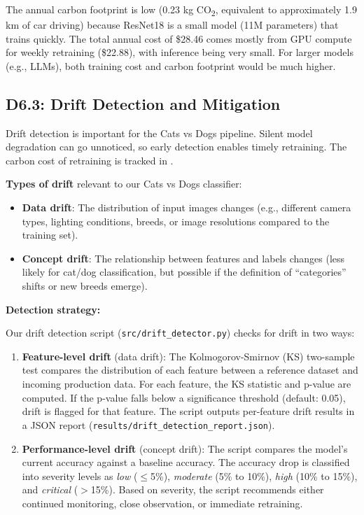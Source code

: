 \documentclass[10pt,twocolumn,letterpaper]{article}
\begin{document}
The annual carbon footprint is low (0.23 kg CO\textsubscript{2}, equivalent to approximately 1.9 km of car driving) because ResNet18 is a small model (11M parameters) that trains quickly. The total annual cost of \$28.46 comes mostly from GPU compute for weekly retraining (\$22.88), with inference being very small. For larger models (e.g., LLMs), both training cost and carbon footprint would be much higher.

\subsection{D6.3: Drift Detection and Mitigation}

Drift detection is important for the Cats vs Dogs pipeline. Silent model degradation can go unnoticed, so early detection enables timely retraining. The carbon cost of retraining is tracked in .

\textbf{Types of drift} relevant to our Cats vs Dogs classifier:

\begin{itemize}
    \item \textbf{Data drift}: The distribution of input images changes (e.g., different camera types, lighting conditions, breeds, or image resolutions compared to the training set).
    \item \textbf{Concept drift}: The relationship between features and labels changes (less likely for cat/dog classification, but possible if the definition of ``categories'' shifts or new breeds emerge).
\end{itemize}

\textbf{Detection strategy:}

Our drift detection script (\texttt{src/drift\_detector.py}) checks for drift in two ways:

\begin{enumerate}
    \item \textbf{Feature-level drift} (data drift): The Kolmogorov-Smirnov (KS) two-sample test compares the distribution of each feature between a reference dataset and incoming production data. For each feature, the KS statistic and p-value are computed. If the p-value falls below a significance threshold (default: 0.05), drift is flagged for that feature. The script outputs per-feature drift results in a JSON report (\texttt{results/drift\_detection\_report.json}).

    \item \textbf{Performance-level drift} (concept drift): The script compares the model's current accuracy against a baseline accuracy. The accuracy drop is classified into severity levels as \textit{low} ($\leq$5\%), \textit{moderate} (5\% to 10\%), \textit{high} (10\% to 15\%), and \textit{critical} ($>$15\%). Based on severity, the script recommends either continued monitoring, close observation, or immediate retraining.
\end{enumerate}
\end{document}
